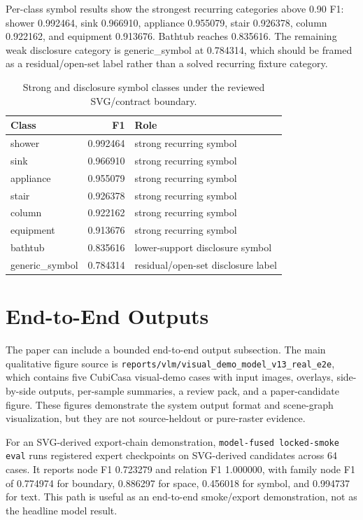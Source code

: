 \documentclass[11pt]{article}
\begin{document}
Per-class symbol results show the strongest recurring categories above 0.90 F1: shower 0.992464, sink 0.966910, appliance 0.955079, stair 0.926378, column 0.922162, and equipment 0.913676. Bathtub reaches 0.835616. The remaining weak disclosure category is generic\_symbol at 0.784314, which should be framed as a residual/open-set label rather than a solved recurring fixture category.

\begin{table}[t]
\centering
\small
\caption{Strong and disclosure symbol classes under the reviewed SVG/contract boundary.}
\label{tab:p301_symbol_classes}
\begin{tabular}{lrl}
\toprule
Class & F1 & Role \\
\midrule
shower & 0.992464 & strong recurring symbol \\
sink & 0.966910 & strong recurring symbol \\
appliance & 0.955079 & strong recurring symbol \\
stair & 0.926378 & strong recurring symbol \\
column & 0.922162 & strong recurring symbol \\
equipment & 0.913676 & strong recurring symbol \\
bathtub & 0.835616 & lower-support disclosure symbol \\
generic\_symbol & 0.784314 & residual/open-set disclosure label \\
\bottomrule
\end{tabular}
\end{table}

\section{End-to-End Outputs}
The paper can include a bounded end-to-end output subsection. The main qualitative figure source is \texttt{reports/vlm/visual\_demo\_model\_v13\_real\_e2e}, which contains five CubiCasa visual-demo cases with input images, overlays, side-by-side outputs, per-sample summaries, a review pack, and a paper-candidate figure. These figures demonstrate the system output format and scene-graph visualization, but they are not source-heldout or pure-raster evidence.

For an SVG-derived export-chain demonstration, \texttt{model-fused locked-smoke eval} runs registered expert checkpoints on SVG-derived candidates across 64 cases. It reports node F1 0.723279 and relation F1 1.000000, with family node F1 of 0.774974 for boundary, 0.886297 for space, 0.456018 for symbol, and 0.994737 for text. This path is useful as an end-to-end smoke/export demonstration, not as the headline model result.
\end{document}
